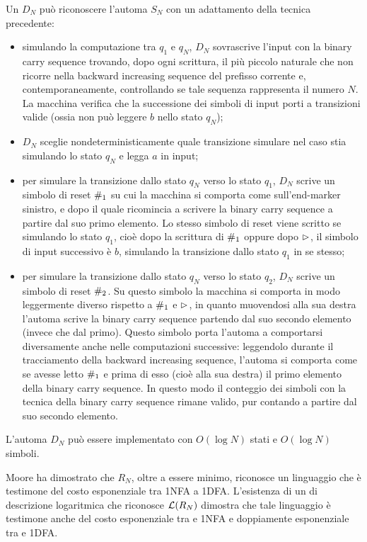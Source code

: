 Un  $D_N$ può riconoscere l'automa $S_N$ con un adattamento della tecnica precedente:
\begin{itemize}
	\item simulando la computazione tra $q_1$ e $q_N$, $D_N$ sovrascrive l'input con la binary carry sequence trovando, dopo ogni scrittura, il più piccolo naturale che non ricorre nella backward increasing sequence del prefisso corrente e, contemporaneamente, controllando se tale sequenza rappresenta il numero $N$. La macchina verifica che la successione dei simboli di input porti a transizioni valide (ossia non può leggere $b$ nello stato $q_N$);
	\item $D_N$ sceglie nondeterministicamente quale transizione simulare nel caso stia simulando lo stato $q_N$ e legga $a$ in input;
	\item per simulare la transizione dallo stato $q_N$ verso lo stato $q_1$, $D_N$ scrive un simbolo di reset $\#_1$ su cui la macchina si comporta come sull'end-marker sinistro, e dopo il quale ricomincia a scrivere la binary carry sequence a partire dal suo primo elemento. Lo stesso simbolo di reset viene scritto se simulando lo stato $q_1$, cioè dopo la scrittura di $\#_1$ oppure dopo $\rhd$, il simbolo di input successivo è $b$, simulando la transizione dallo stato $q_1$ in se stesso;
	\item per simulare la transizione dallo stato $q_N$ verso lo stato $q_2$, $D_N$ scrive un simbolo di reset $\#_2$. Su questo simbolo la macchina si comporta in modo leggermente diverso rispetto a $\#_1$ e $\rhd$, in quanto muovendosi alla sua destra l'automa scrive la binary carry sequence partendo dal suo secondo elemento (invece che dal primo). Questo simbolo porta l'automa a comportarsi diversamente anche nelle computazioni successive: leggendolo durante il tracciamento della backward increasing sequence, l'automa si comporta come se avesse letto $\#_1$ e prima di esso (cioè alla sua destra) il primo elemento della binary carry sequence. In questo modo il conteggio dei simboli con la tecnica della binary carry sequence rimane valido, pur contando a partire dal suo secondo elemento.
\end{itemize}
L'automa $D_N$ può essere implementato con $O(\log N)$ stati e $O(\log N)$ simboli.

Moore ha dimostrato che $R_N$, oltre a essere minimo, riconosce un linguaggio che è testimone del costo esponenziale tra 1NFA a 1DFA. L'esistenza di un  di descrizione logaritmica che riconosce $\mathcal L(R_N)$ dimostra che tale linguaggio è testimone anche del costo esponenziale tra  e 1NFA e doppiamente esponenziale tra  e 1DFA.
